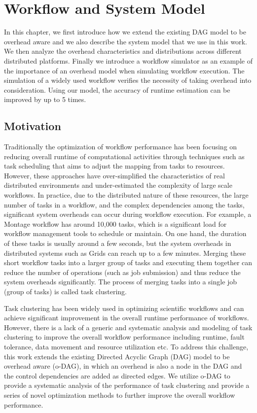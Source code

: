 \chapter{Workflow and System Model}

In this chapter, we first introduce how we extend the existing DAG model to be overhead aware and we also describe the system model that we use in this work. We then analyze the overhead characteristics and distributions across different distributed platforms. Finally we introduce a workflow simulator as an example of the importance of an overhead model when simulating workflow execution. The simulation of a widely used workflow verifies the necessity of taking overhead into consideration. Using our model, the accuracy of runtime estimation can be improved by up to 5 times. 

\section{Motivation}

Traditionally the optimization of workflow performance has been focusing on reducing overall runtime of computational activities through techniques such as  task scheduling that aims to adjust the mapping from tasks to resources. However, these approaches have over-simplified the characteristics of real distributed environments and under-estimated the complexity of large scale workflows. In practice, due to the distributed nature of these resources, the large number of tasks in a workflow, and the complex dependencies among the tasks, significant system overheads can occur during workflow execution. For example, a Montage workflow has around 10,000 tasks, which is a significant load for workflow management tools to schedule or maintain. On one hand, the duration of these tasks is usually around a few seconds, but the system overheads in distributed systems such as Grids can reach up to a few minutes. Merging these short workflow tasks into a larger group of tasks and executing them together can reduce the number of operations (such as job submission) and thus reduce the system overheads significantly. The process of merging tasks into a single job (group of tasks) is called task clustering. 

Task clustering has been widely used in optimizing scientific workflows and can achieve significant improvement in the overall runtime performance \cite{Rynge2012, Singh2008, Li2011, Cao2008} of workflows. However,  there is a lack of a generic and systematic analysis and modeling of task clustering to improve the overall workflow performance including runtime, fault tolerance, data movement and resource utilization etc. To address this challenge, this work extends the existing Directed Acyclic Graph (DAG) model to be overhead aware (o-DAG), in which an overhead is also a node in the DAG and the control dependencies are added as directed edges. We utilize o-DAG to provide a systematic analysis of the performance of task clustering and provide a series of novel optimization methods to further improve the overall workflow performance. 


